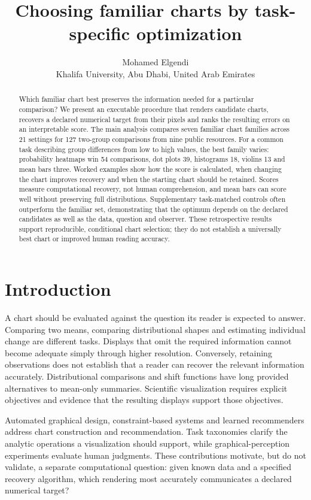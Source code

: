 \documentclass[11pt]{article}
\title{Choosing familiar charts by task-specific optimization}
\author{Mohamed Elgendi\\Khalifa University, Abu Dhabi, United Arab Emirates}
\date{}
\begin{document}
\maketitle
\begin{abstract}
Which familiar chart best preserves the information needed for a particular comparison? We present an executable procedure that renders candidate charts, recovers a declared numerical target from their pixels and ranks the resulting errors on an interpretable score. The main analysis compares seven familiar chart families across 21 settings for 127 two-group comparisons from nine public resources. For a common task describing group differences from low to high values, the best family varies: probability heatmaps win 54 comparisons, dot plots 39, histograms 18, violins 13 and mean bars three. Worked examples show how the score is calculated, when changing the chart improves recovery and when the starting chart should be retained. Scores measure computational recovery, not human comprehension, and mean bars can score well without preserving full distributions. Supplementary task-matched controls often outperform the familiar set, demonstrating that the optimum depends on the declared candidates as well as the data, question and observer. These retrospective results support reproducible, conditional chart selection; they do not establish a universally best chart or improved human reading accuracy.
\end{abstract}

\section*{Introduction}
A chart should be evaluated against the question its reader is expected to answer. Comparing two means, comparing distributional shapes and estimating individual change are different tasks. Displays that omit the required information cannot become adequate simply through higher resolution. Conversely, retaining observations does not establish that a reader can recover the relevant information accurately. Distributional comparisons and shift functions have long provided alternatives to mean-only summaries.\cite{weissgerber2015,rousselet2017} Scientific visualization requires explicit objectives and evidence that the resulting displays support those objectives.\cite{elgendi2017,elgendi2020}

Automated graphical design, constraint-based systems and learned recommenders address chart construction and recommendation.\cite{mackinlay1986,draco,vizml} Task taxonomies clarify the analytic operations a visualization should support, while graphical-perception experiments evaluate human judgments.\cite{amar2005,cleveland1984} These contributions motivate, but do not validate, a separate computational question: given known data and a specified recovery algorithm, which rendering most accurately communicates a declared numerical target?
\end{document}
